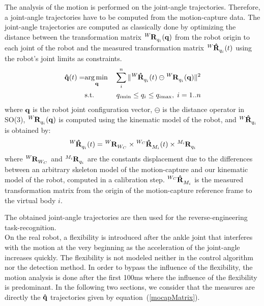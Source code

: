 \documentclass[journal]{IEEEtran}
\begin{document}
The analysis of the motion is performed on the joint-angle trajectories.
Therefore, a joint-angle trajectories have to be computed from the motion-capture data.
The joint-angle trajectories are computed as classically done by optimizing the distance
between the transformation matrix $\tensor[^{W}]{\mathbf{R}}{_{q_i}}(\mbf{q})$ from the 
robot origin to each joint of the robot and the measured
transformation matrix $\tensor[^{W}]{\mathbf{\hat{R}}}{_{q_i}}(t)$ using the robot's joint limits
as constraints. 
\begin{eqnarray}
  \mbf{\hat{q}}(t) =  & \underset{\mbf{q}}\argmin & \sum_i^n \Vert \tensor[^{W}]{\mathbf{\hat{R}}}{_{q_i}}(t) \ominus \tensor[^{W}]{\mathbf{R}}{_{q_i}}(\mbf{q}) \Vert ^2\\
    & \text{s.t.} & q_{i\mathrm{min}} \leq q_i \leq q_{i\mathrm{max}}, \; i = 1..n
  \label{mocapOpti}
\end{eqnarray}
where ${\mathbf{q}}$ is the robot joint configuration vector,
$\ominus$ is the distance operator in SO(3), 
$\tensor[^{W}]{\mathbf{R}}{_{q_i}}(\mbf{q})$ is computed using the kinematic
model of the robot, and $\tensor[^{W}]{\mathbf{\hat{R}}}{_{q_i}}$ is obtained by:
\begin{equation}
  \tensor[^{W}]{\mathbf{\hat{R}}}{_{q_i}}(t) = \tensor[^{W}]{\mathbf{R}}{_{W_{C}}} \times \tensor[^{W_{C}}]{\mathbf{\hat{R}}}{_{M_i}}(t) \times \tensor[^{M_i}]{\mathbf{R}}{_{q_i}}    
  \label{mocapMatrix}
\end{equation}
where $\tensor[^{W}]{\mathbf{R}}{_{W_{C}}}$ and $\tensor[^{M_i}]{\mathbf{R}}{_{q_i}}$ are the constants
displacement due to the differences between an arbitrary skeleton model of the motion-capture and our kinematic model of the robot,
computed in a calibration step.
$\tensor[^{W_{C}}]{\mathbf{\hat{R}}}{_{M_i}}$
is the measured transformation matrix from the origin of the motion-capture reference frame
to the virtual body $i$. 

The obtained joint-angle trajectories are then used for the reverse-engineering task-recognition.\\

On the real robot, a flexibility is introduced after the ankle joint that
interferes with the motion at the very beginning as the acceleration
of the joint-angle increases quickly. The flexibility is not modeled 
neither in the control algorithm nor the detection method.
In order to bypass the influence of the flexibility, the motion analysis is done after the first 100ms
where the influence of the flexibility is predominant.
In the following two sections, we consider that the measures are directly the ${\mathbf{\hat{q}}}$ trajectories
given by equation~(\ref{mocapMatrix}).
\end{document}
